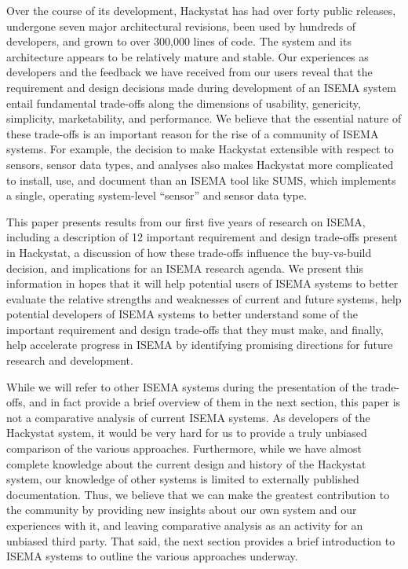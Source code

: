 \documentclass[10pt,twocolumn]{article}
\begin{document}
Over the course of its development, Hackystat has had over forty public
releases, undergone seven major architectural revisions, been used by
hundreds of developers, and grown to over 300,000 lines of code. The system
and its architecture appears to be relatively mature and stable. Our
experiences as developers and the feedback we have received from our users
reveal that the requirement and design decisions made during development of
an ISEMA system entail fundamental trade-offs along the dimensions of
usability, genericity, simplicity, marketability, and performance.  We
believe that the essential nature of these trade-offs is an important
reason for the rise of a community of ISEMA systems.  For example, the
decision to make Hackystat extensible with respect to sensors, sensor data
types, and analyses also makes Hackystat more complicated to install, use,
and document than an ISEMA tool like SUMS, which implements a single, 
operating system-level ``sensor'' and sensor data type. 

This paper presents results from our first five years of research on ISEMA,
including a description of 12 important requirement and design trade-offs
present in Hackystat, a discussion of how these trade-offs influence the
buy-vs-build decision, and implications for an ISEMA research agenda.  We
present this information in hopes that it will help potential users of
ISEMA systems to better evaluate the relative strengths and weaknesses of
current and future systems, help potential developers of ISEMA systems to
better understand some of the important requirement and design trade-offs
that they must make, and finally, help accelerate progress in ISEMA by
identifying promising directions for future research and development.

While we will refer to other ISEMA systems during the presentation of the
trade-offs, and in fact provide a brief overview of them in the next
section, this paper is not a comparative analysis of current ISEMA systems.
As developers of the Hackystat system, it would be very hard for us to
provide a truly unbiased comparison of the various approaches. Furthermore,
while we have almost complete knowledge about the current design and
history of the Hackystat system, our knowledge of other systems is limited
to externally published documentation. Thus, we believe that we can make
the greatest contribution to the community by providing new insights about
our own system and our experiences with it, and leaving comparative
analysis as an activity for an unbiased third party.  That said, the next
section provides a brief introduction to ISEMA systems to outline the
various approaches underway.
\end{document}
